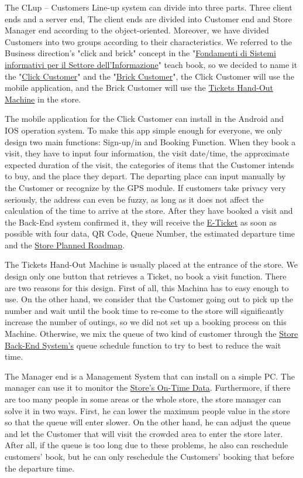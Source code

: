 \documentclass[a4paper,12pt]{report}
\begin{document}
The CLup – Customers Line-up system can divide into three parts. Three client ends and a server end, The client ends are divided into Customer end and Store Manager end according to the object-oriented. Moreover, we have divided Customers into two groups according to their characteristics. We referred to the Business direction's "click and brick" concept in the "\hyperref[Reference documents]{Fondamenti di Sistemi informativi per il Settore dell'Informazione}" teach book, so we decided to name it the "\hyperref[Definitions]{Click Customer}" and the "\hyperref[Definitions]{Brick Customer}", the Click Customer will use the mobile application, and the Brick Customer will use the \hyperref[Definitions]{Tickets Hand-Out Machine} in the store.

The mobile application for the Click Customer can install in the Android and IOS operation system. To make this app simple enough for everyone, we only design two main functions: Sign-up/in and Booking Function. When they book a visit, they have to input four information, the visit date/time, the approximate expected duration of the visit, the categories of items that the Customer intends to buy, and the place they depart. The departing place can input manually by the Customer or recognize by the GPS module. If customers take privacy very seriously, the address can even be fuzzy, as long as it does not affect the calculation of the time to arrive at the store. After they have booked a visit and the Back-End system confirmed it, they will receive the \hyperref[Definitions]{E-Ticket} as soon as possible with four data, QR Code, Queue Number, the estimated departure time and the \hyperref[Definitions]{Store Planned Roadmap}. 

The Tickets Hand-Out Machine is usually placed at the entrance of the store. We design only one button that retrieves a Ticket, no book a visit function. There are two reasons for this design. First of all, this Machina has to easy enough to use. On the other hand, we consider that the Customer going out to pick up the number and wait until the book time to re-come to the store will significantly increase the number of outings, so we did not set up a booking process on this Machine.  Otherwise, we mix the queue of two kind of customer through the \hyperref[Definitions]{Store Back-End System's} queue schedule function to try to best to reduce the wait time.

The Manager end is a Management System that can install on a simple PC. The manager can use it to monitor the \hyperref[Definitions]{Store's On-Time Data}. Furthermore, if there are too many people in some areas or the whole store, the store manager can solve it in two ways. First, he can lower the maximum people value in the store so that the queue will enter slower. On the other hand, he can adjust the queue and let the Customer that will visit the crowded area to enter the store later. After all, if the queue is too long due to these problems, he also can reschedule customers’ book, but he can only reschedule the Customers' booking that before the departure time. 
\end{document}
